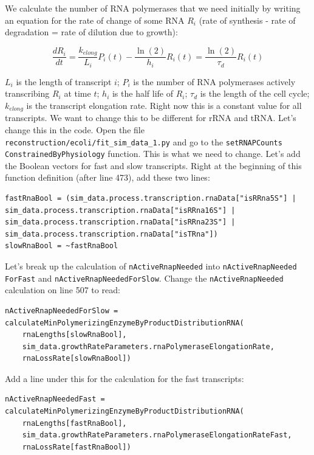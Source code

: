 \documentclass[12pt]{article}
\begin{document}
\par

We calculate the number of RNA polymerases that we need initially by writing an equation for the rate of change of some RNA $R_i$ (rate of synthesis - rate of degradation = rate of dilution due to growth):

$$
\frac{d R_i}{dt} = \frac{k_{elong}}{L_i}P_i(t) - \frac{\ln(2)}{h_i}R_i(t) = \frac{\ln(2)}{\tau_d}R_i(t)
$$


$L_i$ is the length of transcript $i$; $P_i$ is the number of RNA polymerases actively transcribing $R_i$ at time $t$; $h_i$ is the half life of $R_i$; $\tau_d$ is the length of the cell cycle; $k_{elong}$ is the transcript elongation rate. Right now this is a constant value for all transcripts. We want to change this to be different for rRNA and tRNA. Let's change this in the code. Open the file \texttt{reconstruction/ecoli/fit\_sim\_data\_1.py} and go to the \texttt{setRNAPCounts \allowbreak ConstrainedByPhysiology} function. This is what we need to change. Let's add the Boolean vectors for fast and slow transcripts. Right at the beginning of this function definition (after line 473), add these two lines:

\lstset{language=Python}
\begin{lstlisting}
fastRnaBool = (sim_data.process.transcription.rnaData["isRRna5S"] | sim_data.process.transcription.rnaData["isRRna16S"] | sim_data.process.transcription.rnaData["isRRna23S"] | sim_data.process.transcription.rnaData["isTRna"])
slowRnaBool = ~fastRnaBool
\end{lstlisting}

Let's break up the calculation of \texttt{nActiveRnapNeeded} into \texttt{nActiveRnapNeeded \allowbreak ForFast} and \texttt{nActiveRnapNeededForSlow}. Change the \texttt{nActiveRnapNeeded} calculation on line 507 to read:

\begin{lstlisting}
nActiveRnapNeededForSlow = calculateMinPolymerizingEnzymeByProductDistributionRNA(
    rnaLengths[slowRnaBool], 
    sim_data.growthRateParameters.rnaPolymeraseElongationRate, 
    rnaLossRate[slowRnaBool])
\end{lstlisting}

Add a line under this for the calculation for the fast transcripts:

\begin{lstlisting}
nActiveRnapNeededFast = calculateMinPolymerizingEnzymeByProductDistributionRNA(
    rnaLengths[fastRnaBool], 
    sim_data.growthRateParameters.rnaPolymeraseElongationRateFast, 
    rnaLossRate[fastRnaBool])
\end{lstlisting}
\end{document}
